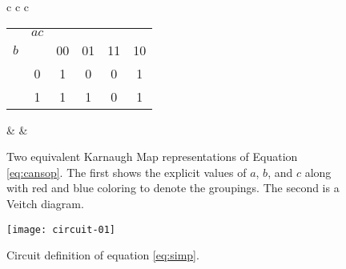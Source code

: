 \documentclass[12pt]{article}
\begin{document}
\begin{figure}[!hbt]
\begin{center}

\begin{tabular}{c c c}


\begin{tabular}[b]{cc|c|c|c|c|}
     & \multicolumn{1}{c}{$ac$} & \multicolumn{4}{c}{} \\
$b$ &  \multicolumn{1}{c}{} & \multicolumn{1}{c}{00} & \multicolumn{1}{c}{01} & \multicolumn{1}{c}{11} & \multicolumn{1}{c}{10} \\
	\cline{3-6}
	& 0 & \cellcolor{red!40}1 & 0 & 0 & \cellcolor{red!40}1 \\
	\cline{3-6}
	& 1 & \cellcolor{red!40!blue!40}1 & \cellcolor{blue!40}1 & 0 & \cellcolor{red!40}1 \\
	\cline{3-6}
\end{tabular}

& &


\end{tabular} %

\end{center}
\caption{
Two equivalent Karnaugh Map representations of Equation \ref{eq:cansop}.
The first shows the explicit values of $a$, $b$, and $c$ along with
red and blue coloring to denote the groupings.
The second is a Veitch \cite{Veitch:1952:CMS:609784.609801} diagram.}
\label{fig:karnmap}
\end{figure}


\begin{figure}[!hbtp]
\center
\texttt{[image: circuit-01]}
\caption{Circuit definition of equation \ref{eq:simp}.}
\label{fig:circuit}
\end{figure}
\end{document}
